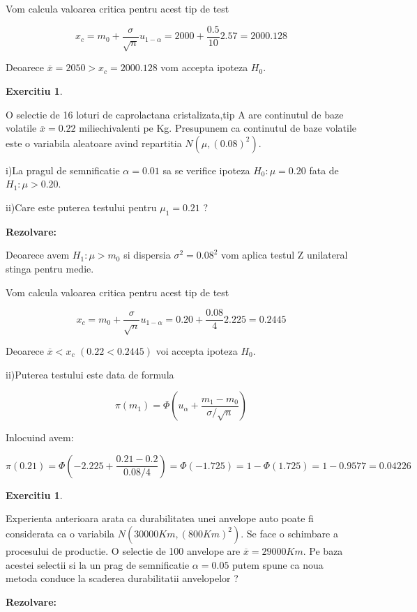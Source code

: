 \documentclass{article}
\newtheorem{exercise}[theorem]{Exercitiu}
\begin{document}
Vom calcula valoarea critica pentru acest tip de test

\[
x_{c}=m_{0}+\frac{\sigma }{\sqrt{n}}u_{1-\alpha }=2000+\frac{0.5}{10}%
2.57=2000.128 
\]

Deoarece $\overline{x}=2050>x_{c}=2000.128$ vom accepta ipoteza $H_{0}.$

\begin{exercise}
\bigskip 
\end{exercise}

O selectie de 16 loturi de caprolactana cristalizata,tip A are continutul de
baze volatile $\overline{x}=0.22$ miliechivalenti pe Kg. Presupunem ca
continutul de baze volatile este o variabila aleatoare avind repartitia $%
N(\mu ,(0.08)^{2})$.

i)La pragul de semnificatie $\alpha =0.01$ sa se verifice ipoteza $H_{0}:\mu
=0.20$ fata de $H_{1}:\mu >0.20$.

ii)Care este puterea testului pentru $\mu _{1}=0.21$ ?

\textbf{Rezolvare:}

Deoarece avem $H_{1}:\mu >m_{0}$ si dispersia $\sigma ^{2}=0.08^{2}$ vom
aplica testul Z unilateral stinga pentru medie.

Vom calcula valoarea critica pentru acest tip de test

\[
x_{c}=m_{0}+\frac{\sigma }{\sqrt{n}}u_{1-\alpha }=0.20+\frac{0.08}{4}%
2.225=0.2445 
\]

Deoarece $\overline{x}<x_{c}$ $(0.22<0.2445)$ voi accepta ipoteza $H_{0}$.

ii)Puterea testului este data de formula

\[
\pi (m_{1})=\Phi \left( u_{\alpha }+\frac{m_{1}-m_{0}}{\sigma /\sqrt{n}}%
\right) 
\]

Inlocuind avem:

\[
\pi (0.21)=\Phi (-2.225+\frac{0.21-0.2}{0.08/4})=\Phi (-1.725)=1-\Phi
(1.725)=1-0.9577=0.04226 
\]

\begin{exercise}
\bigskip 
\end{exercise}

Experienta anterioara arata ca durabilitatea unei anvelope auto poate fi
considerata ca o variabila $N(30000Km,(800Km)^{2})$. Se face o schimbare a
procesului de productie. O selectie de 100 anvelope are $\overline{x}=29000Km
$. Pe baza acestei selectii si la un prag de semnificatie $\alpha =0.05$
putem spune ca noua metoda conduce la scaderea durabilitatii anvelopelor ?

\textbf{Rezolvare:}
\end{document}
